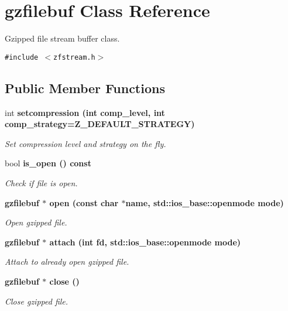 \section{gzfilebuf Class Reference}
\label{classgzfilebuf}
Gzipped file stream buffer class.  


{\tt \#include $<$zfstream.h$>$}

\subsection*{Public Member Functions}
\begin{CompactItemize}
\item 
int \bf{setcompression} (int comp\_\-level, int comp\_\-strategy=Z\_\-DEFAULT\_\-STRATEGY)
\begin{CompactList}\small\item\em Set compression level and strategy on the fly. \item\end{CompactList}\item 
bool \bf{is\_\-open} () const 
\begin{CompactList}\small\item\em Check if file is open. \item\end{CompactList}\item 
\bf{gzfilebuf} $\ast$ \bf{open} (const char $\ast$name, std::ios\_\-base::openmode mode)
\begin{CompactList}\small\item\em Open gzipped file. \item\end{CompactList}\item 
\bf{gzfilebuf} $\ast$ \bf{attach} (int fd, std::ios\_\-base::openmode mode)
\begin{CompactList}\small\item\em Attach to already open gzipped file. \item\end{CompactList}\item 
\bf{gzfilebuf} $\ast$ \bf{close} ()
\begin{CompactList}\small\item\em Close gzipped file. \item\end{CompactList}\end{CompactItemize}
